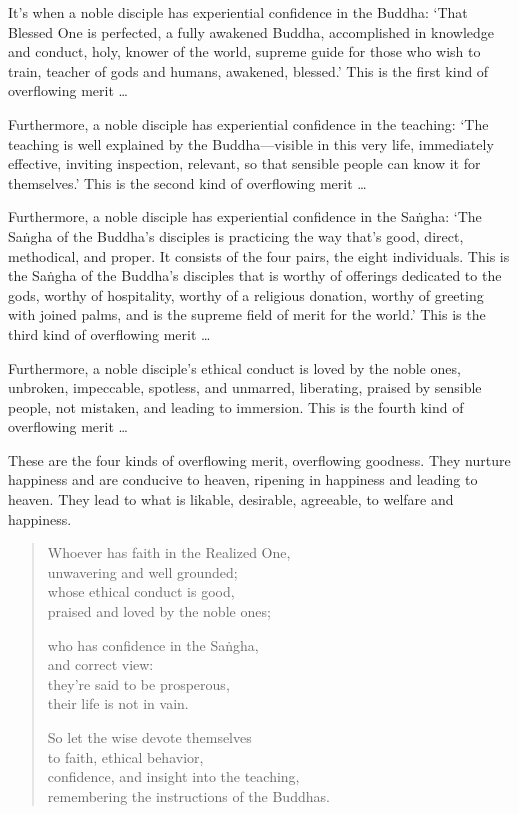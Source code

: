 \documentclass[12pt,openany]{book}%
\begin{document}
It’s when a noble disciple has experiential confidence in the Buddha: ‘That Blessed One is perfected, a fully awakened Buddha, accomplished in knowledge and conduct, holy, knower of the world, supreme guide for those who wish to train, teacher of gods and humans, awakened, blessed.’ This is the first kind of overflowing merit … 

Furthermore, a noble disciple has experiential confidence in the teaching: ‘The teaching is well explained by the Buddha—visible in this very life, immediately effective, inviting inspection, relevant, so that sensible people can know it for themselves.’ This is the second kind of overflowing merit … 

Furthermore, a noble disciple has experiential confidence in the \textsanskrit{Saṅgha}: ‘The \textsanskrit{Saṅgha} of the Buddha’s disciples is practicing the way that’s good, direct, methodical, and proper. It consists of the four pairs, the eight individuals. This is the \textsanskrit{Saṅgha} of the Buddha’s disciples that is worthy of offerings dedicated to the gods, worthy of hospitality, worthy of a religious donation, worthy of greeting with joined palms, and is the supreme field of merit for the world.’ This is the third kind of overflowing merit … 

Furthermore, a noble disciple’s ethical conduct is loved by the noble ones, unbroken, impeccable, spotless, and unmarred, liberating, praised by sensible people, not mistaken, and leading to immersion. This is the fourth kind of overflowing merit … 

These are the four kinds of overflowing merit, overflowing goodness. They nurture happiness and are conducive to heaven, ripening in happiness and leading to heaven. They lead to what is likable, desirable, agreeable, to welfare and happiness. 

\begin{verse}%
Whoever has faith in the Realized One, \\
unwavering and well grounded; \\
whose ethical conduct is good, \\
praised and loved by the noble ones; 

who has confidence in the \textsanskrit{Saṅgha}, \\
and correct view: \\
they’re said to be prosperous, \\
their life is not in vain. 

So let the wise devote themselves \\
to faith, ethical behavior, \\
confidence, and insight into the teaching, \\
remembering the instructions of the Buddhas. 

%
\end{verse}
\end{document}
